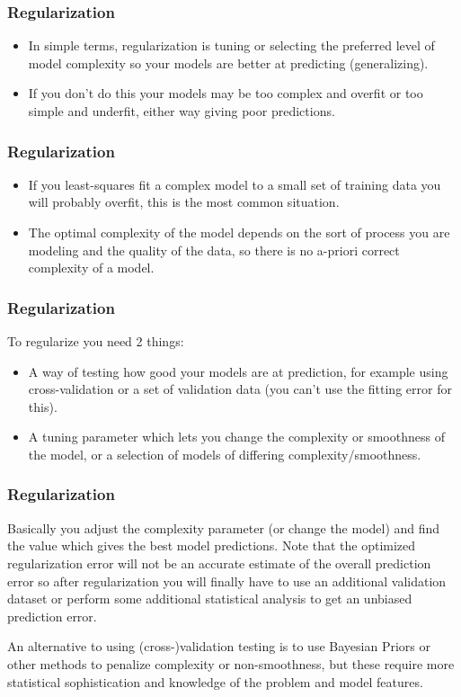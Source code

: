 \documentclass{beamer}
\begin{document}
\begin{frame}
	\frametitle{Regularization}
	\large
	\begin{itemize}
\item In simple terms, regularization is tuning or selecting the preferred level of model complexity so your models are better at predicting (generalizing). 
\item If you don't do this your models may be too complex and overfit or too simple and underfit, either way giving poor predictions.
	\end{itemize}

\end{frame}
\begin{frame}
	\frametitle{Regularization}
	\large
	\begin{itemize}
\item If you least-squares fit a complex model to a small set of training data you will probably overfit, this is the most common situation. 
\item The optimal complexity of the model depends on the sort of process you are modeling and the quality of the data, so there is no a-priori correct complexity of a model.
	\end{itemize}

\end{frame}
\begin{frame}
	\frametitle{Regularization}
	\large
To regularize you need 2 things:

\begin{itemize}
\item A way of testing how good your models are at prediction, for example using cross-validation or a set of validation data (you can't use the fitting error for this).
\item A tuning parameter which lets you change the complexity or smoothness of the model, or a selection of models of differing complexity/smoothness.
\end{itemize}

\end{frame}
\begin{frame}
	\frametitle{Regularization}
	\large
Basically you adjust the complexity parameter (or change the model) and find the value which gives the best model predictions.
Note that the optimized regularization error will not be an accurate estimate of the overall prediction error so after regularization you will finally have to use an additional validation dataset or perform some additional statistical analysis to get an unbiased prediction error.

An alternative to using (cross-)validation testing is to use Bayesian Priors or other methods to penalize complexity or non-smoothness, but these require more statistical sophistication and knowledge of the problem and model features.
\end{frame}
\end{document}
